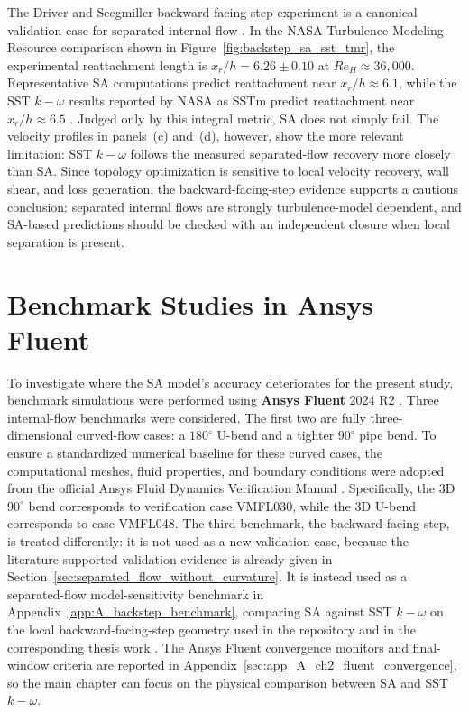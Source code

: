 The Driver and Seegmiller backward-facing-step experiment is a canonical validation case for separated internal flow \cite{DriverSeegmiller1985}. In the NASA Turbulence Modeling Resource comparison shown in Figure~\ref{fig:backstep_sa_sst_tmr}, the experimental reattachment length is $x_r/h = 6.26 \pm 0.10$ at $Re_H \approx 36{,}000$. Representative SA computations predict reattachment near $x_r/h \approx 6.1$, while the SST $k-\omega$ results reported by NASA as SSTm predict reattachment near $x_r/h \approx 6.5$ \cite{NasaBackstepTMR}. Judged only by this integral metric, SA does not simply fail. The velocity profiles in panels~(c) and~(d), however, show the more relevant limitation: SST $k-\omega$ follows the measured separated-flow recovery more closely than SA. Since topology optimization is sensitive to local velocity recovery, wall shear, and loss generation, the backward-facing-step evidence supports a cautious conclusion: separated internal flows are strongly turbulence-model dependent, and SA-based predictions should be checked with an independent closure when local separation is present.

\section{Benchmark Studies in Ansys Fluent}
\label{sec:ansys_benchmarks}
To investigate where the SA model's accuracy deteriorates for the present study, benchmark simulations were performed using \textbf{Ansys Fluent} 2024 R2 \cite{AnsysFluentUserGuide2024R2}. Three internal-flow benchmarks were considered. The first two are fully three-dimensional curved-flow cases: a $180^\circ$ U-bend and a tighter $90^\circ$ pipe bend. To ensure a standardized numerical baseline for these curved cases, the computational meshes, fluid properties, and boundary conditions were adopted from the official Ansys Fluid Dynamics Verification Manual \cite{AnsysVerification2024}. Specifically, the 3D $90^\circ$ bend corresponds to verification case VMFL030, while the 3D U-bend corresponds to case VMFL048. The third benchmark, the backward-facing step, is treated differently: it is not used as a new validation case, because the literature-supported validation evidence is already given in Section~\ref{sec:separated_flow_without_curvature}. It is instead used as a separated-flow model-sensitivity benchmark in Appendix~\ref{app:A_backstep_benchmark}, comparing SA against SST $k-\omega$ \cite{Menter1994} on the local backward-facing-step geometry used in the repository and in the corresponding thesis work \cite{Marcibal2024}.
The Ansys Fluent convergence monitors and final-window criteria are reported in Appendix~\ref{sec:app_A_ch2_fluent_convergence}, so the main chapter can focus on the physical comparison between SA and SST $k-\omega$.

